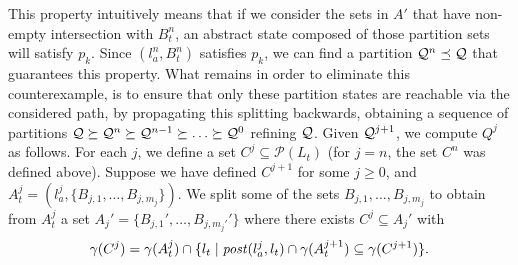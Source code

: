 This property intuitively means that if we consider the sets in $A'$ that have non-empty intersection with $B_t^n$, an abstract state composed of those partition sets will satisfy $p_k$. Since $(l_a^n,B_t^n)$ satisfies $p_k$, we can find a partition $\mathcal{Q}^n \preceq \mathcal{Q}$ that guarantees this property. What remains in order to eliminate this counterexample, is to ensure that only these partition states are reachable via the considered path, by propagating this splitting backwards, obtaining a sequence of partitions $\mathcal{Q} \succeq \mathcal{Q}^n \succeq \mathcal{Q}^{n-1} \succeq \ldots \succeq \mathcal{Q}^0$ refining $\mathcal{Q}$. Given $\mathcal{Q}^{j+1}$, we compute $Q^j$ as follows. For each $j$, we define a set $C^j \subseteq \mathcal{P}(L_t)$ (for $j=n$, the set $C^n$ was defined above). Suppose we have defined $C^{j+1}$ for some $j \geq 0$, and $A_t^j = (l_a^j,\{B_{j,1},\ldots,B_{j,m_j}\})$. We split some of the sets $B_{j,1},\ldots,B_{j,m_j}$ to obtain from $A_t^j$ a set $A_j' = \{B_{j,1}',\ldots,B_{j,m_j'}'\}$ where there exists $C^j \subseteq A_j'$ with
\[\gamma(C^j) = \gamma(A_t^j) \cap \{l_t \mid \mathit{post}(l_a^j,l_t) \cap \gamma(A_t^{j+1}) \subseteq \gamma(C^{j+1})\}.\] 
